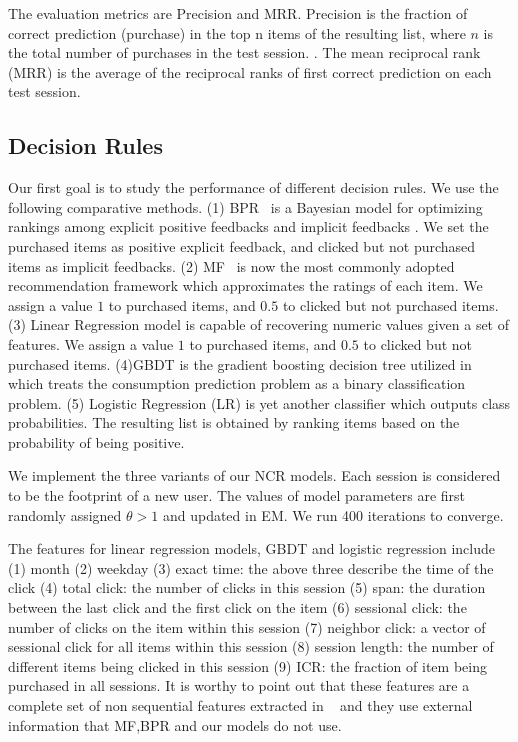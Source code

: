 \documentclass[sigconf]{acmart}
\begin{document}
The evaluation metrics are Precision and MRR. Precision is the fraction of correct prediction (purchase) in the top n items of the resulting list, where $n$ is the total number of purchases in the test session. . The mean reciprocal rank (MRR) is the average of the reciprocal ranks of first correct prediction on each test session.
\subsection{Decision Rules}
Our first goal is to study the performance of different decision rules. We use the following comparative methods. (1) BPR~\cite{Rendle2009BPR} is a Bayesian model for optimizing rankings among explicit positive feedbacks and implicit feedbacks . We set the purchased items as positive explicit feedback, and clicked but not purchased items as implicit feedbacks. (2) MF~\cite{Koren2009Matrix} is now the most commonly adopted recommendation framework which approximates the ratings of each item. We assign a value $1$ to purchased items, and $0.5$ to clicked but not purchased items. (3) Linear Regression model is capable of recovering numeric values given a set of features. We assign a value $1$ to purchased items, and $0.5$ to clicked but not purchased items. (4)GBDT is the  gradient boosting decision tree utilized in~\cite{Yan2015E} which treats the consumption prediction problem as a binary classification problem. (5) Logistic Regression (LR) is yet another classifier which outputs class probabilities. The resulting list is obtained by ranking items based on the probability of being positive. 

We implement the three variants of our NCR models. Each session is considered to be the footprint of a new user.  The values of model parameters are first randomly assigned $\theta>1$ and updated in EM. We run 400 iterations to converge.


The features for linear regression models, GBDT and logistic regression include (1) month (2) weekday (3) exact time: the above three describe the time of the click (4) total click: the number of clicks in this session (5) span: the duration between the last click and the first click on the item (6) sessional click: the number of clicks on the item within this session (7) neighbor click: a vector of sessional click for all items within this session (8) session length: the number of different items being clicked in this session (9) ICR: the fraction of item being purchased in all sessions. It is worthy to point out that these features are a complete set of non sequential features extracted in ~\cite{Yan2015E} and they use external information that MF,BPR and our models do not use.
\end{document}
